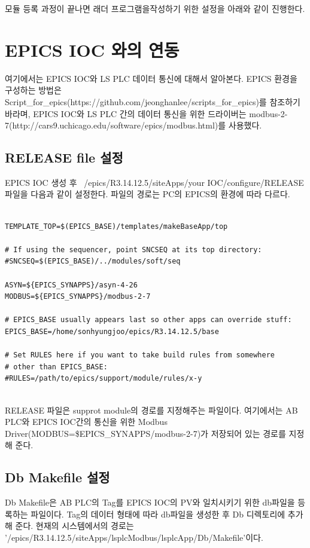 \documentclass[11pt
  , a4paper
  , article
  , oneside
]{memoir}
\begin{document}
 모듈 등록 과정이 끝나면 래더 프로그램을작성하기 위한 설정을 아래와 같이 진행한다.
 

\newpage
 
\chapter{EPICS IOC 와의 연동}
여기에서는 EPICS IOC와 LS PLC 데이터 통신에 대해서 알아본다. EPICS 환경을 구성하는 방법은 Script\_for\_epics(https://github.com/jeonghanlee/scripts\_for\_epics)를 참조하기 바라며, EPICS IOC와 LS PLC 간의 데이터 통신을 위한 드라이버는 modbus-2-7(http://cars9.uchicago.edu/software/epics/modbus.html)를 사용했다. \\

\section{RELEASE file 설정}
EPICS IOC 생성 후 ~/epics/R3.14.12.5/siteApps/your IOC/configure/RELEASE 파일을 다음과 같이 설정한다. 파일의 경로는 PC의 EPICS의 환경에 따라 다르다.\\

\begin{lstlisting}[style=termstyle]

TEMPLATE_TOP=$(EPICS_BASE)/templates/makeBaseApp/top

# If using the sequencer, point SNCSEQ at its top directory:
#SNCSEQ=$(EPICS_BASE)/../modules/soft/seq

ASYN=${EPICS_SYNAPPS}/asyn-4-26
MODBUS=${EPICS_SYNAPPS}/modbus-2-7

# EPICS_BASE usually appears last so other apps can override stuff:
EPICS_BASE=/home/sonhyungjoo/epics/R3.14.12.5/base

# Set RULES here if you want to take build rules from somewhere
# other than EPICS_BASE:
#RULES=/path/to/epics/support/module/rules/x-y


\end{lstlisting}

RELEASE 파일은 supprot module의 경로를 지정해주는 파일이다. 여기에서는 AB PLC와 EPICS IOC간의 통신을 위한 Modbus Driver(MODBUS=\${EPICS\_SYNAPPS}/modbus-2-7)가 저장되어 있는 경로를 지정해 준다.\

\section{Db Makefile 설정}

Db Makefile은 AB PLC의 Tag를 EPICS IOC의 PV와 일치시키기 위한 db파일을 등록하는 파일이다. Tag의 데이터 형태에 따라 db파일을 생성한 후 Db 디렉토리에 추가해 준다. 현재의 시스템에서의 경로는 '/epics/R3.14.12.5/siteApps/lsplcModbus/lsplcApp/Db/Makefile'이다.\
 
\end{document}
